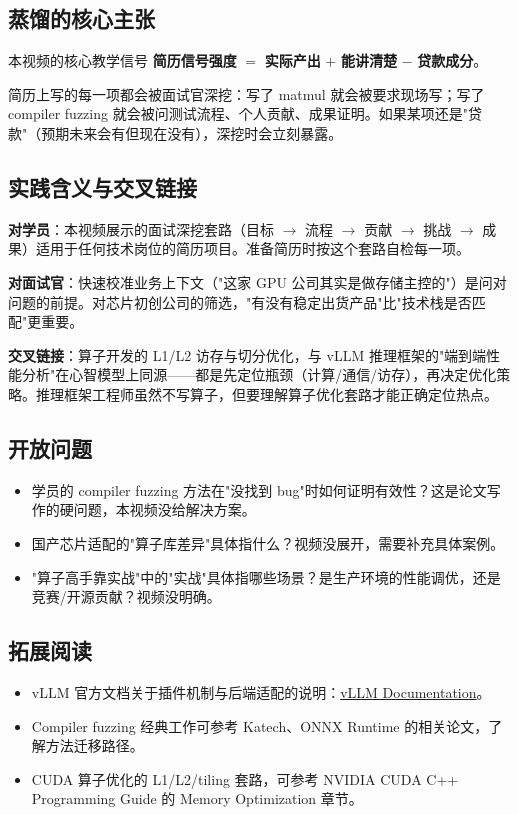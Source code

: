 \documentclass[a4paper]{article}
\begin{document}
\subsection{蒸馏的核心主张}

\begin{importantbox}{本视频的核心教学信号}
\textbf{简历信号强度} $=$ \textbf{实际产出} $+$ \textbf{能讲清楚} $-$ \textbf{贷款成分}。

简历上写的每一项都会被面试官深挖：写了 matmul 就会被要求现场写；写了 compiler fuzzing 就会被问测试流程、个人贡献、成果证明。如果某项还是"贷款"（预期未来会有但现在没有），深挖时会立刻暴露。
\end{importantbox}

\subsection{实践含义与交叉链接}

\textbf{对学员}：本视频展示的面试深挖套路（目标 $\rightarrow$ 流程 $\rightarrow$ 贡献 $\rightarrow$ 挑战 $\rightarrow$ 成果）适用于任何技术岗位的简历项目。准备简历时按这个套路自检每一项。

\textbf{对面试官}：快速校准业务上下文（"这家 GPU 公司其实是做存储主控的"）是问对问题的前提。对芯片初创公司的筛选，"有没有稳定出货产品"比"技术栈是否匹配"更重要。

\textbf{交叉链接}：算子开发的 L1/L2 访存与切分优化，与 vLLM 推理框架的"端到端性能分析"在心智模型上同源——都是先定位瓶颈（计算/通信/访存），再决定优化策略。推理框架工程师虽然不写算子，但要理解算子优化套路才能正确定位热点。

\subsection{开放问题}

\begin{itemize}
\item 学员的 compiler fuzzing 方法在"没找到 bug"时如何证明有效性？这是论文写作的硬问题，本视频没给解决方案。
\item 国产芯片适配的"算子库差异"具体指什么？视频没展开，需要补充具体案例。
\item "算子高手靠实战"中的"实战"具体指哪些场景？是生产环境的性能调优，还是竞赛/开源贡献？视频没明确。
\end{itemize}

\subsection{拓展阅读}

\begin{itemize}
\item vLLM 官方文档关于插件机制与后端适配的说明：\href{https://docs.vllm.ai/en/latest/}{vLLM Documentation}。
\item Compiler fuzzing 经典工作可参考 Katech、ONNX Runtime 的相关论文，了解方法迁移路径。
\item CUDA 算子优化的 L1/L2/tiling 套路，可参考 NVIDIA CUDA C++ Programming Guide 的 Memory Optimization 章节。
\end{itemize}

\end{document}
